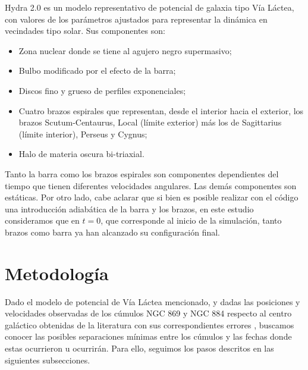 \documentclass[baaa]{baaa}
\begin{document}
{\sc Hydra 2.0} es un modelo representativo de potencial de galaxia tipo Vía Láctea, con valores de los parámetros ajustados para representar la din\'amica en vecindades tipo solar. Sus componentes son: 
\begin{itemize}
\item Zona nuclear donde se tiene al agujero negro supermasivo; 
\item Bulbo modificado por el efecto de la barra; 
\item Discos fino y grueso de perfiles exponenciales; 
\item Cuatro brazos espirales que representan, desde el interior hacia el exterior, los brazos Scutum-Centaurus, Local (l\'imite exterior) m\'as los de Sagittarius (l\'imite interior), Perseus y Cygnus; 
\item Halo de materia oscura bi-triaxial.
\end{itemize}
 Tanto la barra como los brazos espirales son componentes dependientes del tiempo que tienen diferentes velocidades angulares. Las demás componentes son estáticas. Por otro lado, cabe aclarar que si bien es posible realizar con el c\'odigo una introducci\'on adiab\'atica de la barra y los brazos, en este estudio consideramos que en $t=0$, que corresponde al inicio de la simulaci\'on, tanto brazos como barra ya han alcanzado su configuraci\'on final. 

\section{Metodolog\'ia}
Dado el modelo de potencial de V\'ia L\'actea mencionado, y dadas las posiciones y velocidades observadas de los c\'umulos NGC 869 y NGC 884 respecto al centro gal\'actico obtenidas de la literatura con sus correspondientes errores \citep{Tarricq2021},  buscamos conocer las posibles separaciones m\'inimas entre los c\'umulos y las fechas donde estas ocurrieron u ocurrir\'an. Para ello, seguimos los pasos descritos en las siguientes subsecciones.
\end{document}
